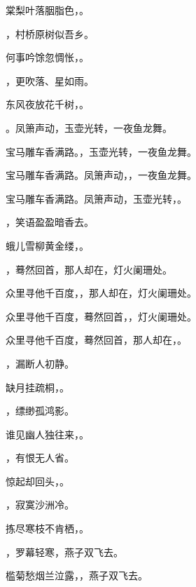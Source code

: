 \documentclass[12pt, a4paper, addpoints]{exam}
\begin{document}
\begin{questions}
\question[1] 棠梨叶落胭脂色，\uline{\qquad\qquad\qquad}。

\question[1] \uline{\qquad\qquad\qquad}，村桥原树似吾乡。

\question[1] 何事吟馀忽惆怅，\uline{\qquad\qquad\qquad}。

\question[1] \uline{\qquad\qquad\qquad}，更吹落、星如雨。

\question[1] 东风夜放花千树，\uline{\qquad\qquad\qquad}。

\question[1] \uline{\qquad\qquad\qquad}。凤箫声动，玉壶光转，一夜鱼龙舞。

\question[1] 宝马雕车香满路。\uline{\qquad\qquad\qquad}，玉壶光转，一夜鱼龙舞。

\question[1] 宝马雕车香满路。凤箫声动，\uline{\qquad\qquad\qquad}，一夜鱼龙舞。

\question[1] 宝马雕车香满路。凤箫声动，玉壶光转，\uline{\qquad\qquad\qquad}。

\question[1] \uline{\qquad\qquad\qquad}，笑语盈盈暗香去。

\question[1] 蛾儿雪柳黄金缕，\uline{\qquad\qquad\qquad}。

\question[1] \uline{\qquad\qquad\qquad}，蓦然回首，那人却在，灯火阑珊处。

\question[1] 众里寻他千百度，\uline{\qquad\qquad\qquad}，那人却在，灯火阑珊处。

\question[1] 众里寻他千百度，蓦然回首，\uline{\qquad\qquad\qquad}，灯火阑珊处。

\question[1] 众里寻他千百度，蓦然回首，那人却在，\uline{\qquad\qquad\qquad}。

\question[1] \uline{\qquad\qquad\qquad}，漏断人初静。

\question[1] 缺月挂疏桐，\uline{\qquad\qquad\qquad}。

\question[1] \uline{\qquad\qquad\qquad}，缥缈孤鸿影。

\question[1] 谁见幽人独往来，\uline{\qquad\qquad\qquad}。

\question[1] \uline{\qquad\qquad\qquad}，有恨无人省。

\question[1] 惊起却回头，\uline{\qquad\qquad\qquad}。

\question[1] \uline{\qquad\qquad\qquad}，寂寞沙洲冷。

\question[1] 拣尽寒枝不肯栖，\uline{\qquad\qquad\qquad}。

\question[1] \uline{\qquad\qquad\qquad}，罗幕轻寒，燕子双飞去。

\question[1] 槛菊愁烟兰泣露，\uline{\qquad\qquad\qquad}，燕子双飞去。


\end{questions}
\end{document}
